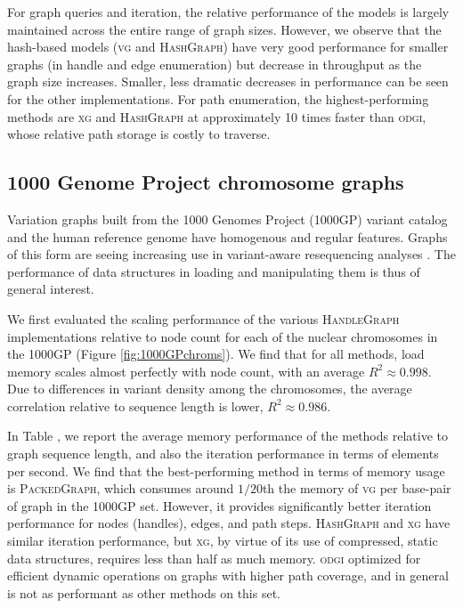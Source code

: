 \documentclass{article}
\begin{document}
For graph queries and iteration, the relative performance of the models is largely maintained across the entire range of graph sizes.
However, we observe that the hash-based models (\textsc{vg} and \textsc{HashGraph}) have very good performance for smaller graphs (in handle and edge enumeration) but decrease in throughput as the graph size increases.
Smaller, less dramatic decreases in performance can be seen for the other implementations.
For path enumeration, the highest-performing methods are \textsc{xg} and \textsc{HashGraph} at approximately 10 times faster than \textsc{odgi}, whose relative path storage is costly to traverse.

\subsection{1000 Genome Project chromosome graphs}

Variation graphs built from the 1000 Genomes Project (1000GP) variant catalog and the human reference genome have homogenous and regular features.
Graphs of this form are seeing increasing use in variant-aware resequencing analyses \cite{crysnanto2019sequence}.
The performance of data structures in loading and manipulating them is thus of general interest.

We first evaluated the scaling performance of the various \textsc{HandleGraph} implementations relative to node count for each of the nuclear chromosomes in the 1000GP (Figure \ref{fig:1000GPchroms}).
We find that for all methods, load memory scales almost perfectly with node count, with an average $R^2 \approx 0.998$.
Due to differences in variant density among the chromosomes, the average correlation relative to sequence length is lower, $R^2 \approx 0.986$.

In Table \label{table:1000GPchroms}, we report the average memory performance of the methods relative to graph sequence length, and also the iteration performance in terms of elements per second.
We find that the best-performing method in terms of memory usage is \textsc{PackedGraph}, which consumes around $1/20$th the memory of \textsc{vg} per base-pair of graph in the 1000GP set.
However, it provides significantly better iteration performance for nodes (handles), edges, and path steps.
\textsc{HashGraph} and \textsc{xg} have similar iteration performance, but \textsc{xg}, by virtue of its use of compressed, static data structures, requires less than half as much memory.
\textsc{odgi} optimized for efficient dynamic operations on graphs with higher path coverage, and in general is not as performant as other methods on this set.
\end{document}
